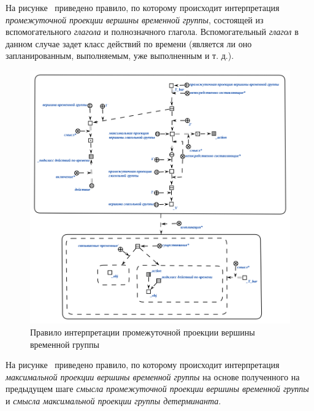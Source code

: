 На рисунке~\textit{} приведено правило, по которому происходит интерпретация \textit{промежуточной проекции вершины временной группы}, состоящей из вспомогательного \textit{глагола} и полнозначного глагола.
Вспомогательный \textit{глагол} в данном случае задет класс действий по времени (является ли оно запланированным, выполняемым, уже выполненным и т. д.).

\begin{figure}[h]
    \centering
    \includegraphics[scale=0.8]{images/part2/chapter_lang/d_sem_5}
    \caption{Правило интерпретации промежуточной проекции вершины временной группы}
    \label{fig:d_sem_5}
\end{figure}

На рисунке~\textit{} приведено правило, по которому происходит интерпретация \textit{максимальной проекции вершины временной группы} на основе полученного на предыдущем шаге \textit{смысла} \textit{промежуточной проекции вершины временной группы} и \textit{смысла} \textit{максимальной проекции группы детерминанта}.

